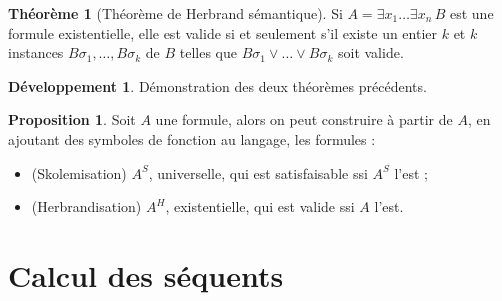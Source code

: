 \documentclass[a4paper, 11pt, twocolumn]{article}
\theoremstyle{definition}
\newtheorem{definition}[equation]{Définition}
\newtheorem{proposition}[equation]{Proposition}
\newtheorem{theorem}[equation]{Théorème}
\newcounter{n}
\newtheorem{dev}[n]{Développement}
\begin{document}
\begin{theorem}[Théorème de Herbrand sémantique]
  Si $A = \exists x_1 \ldots \exists x_n\, B$ est une formule existentielle,
  elle est valide si et seulement s'il existe un entier $k$ et $k$ instances $B
  \sigma_1, \ldots, B \sigma_k$ de $B$ telles que $B \sigma_1 \lor \ldots \lor B
  \sigma_k$ soit valide.
\end{theorem}

\begin{dev}
  Démonstration des deux théorèmes précédents.
\end{dev}

\begin{proposition}
  Soit $A$ une formule, alors on peut construire à partir de $A$, en ajoutant
  des symboles de fonction au langage, les formules :
  \begin{itemize}
  \item (Skolemisation) $A^S$, universelle, qui est satisfaisable ssi $A^S$
    l'est ;
  \item (Herbrandisation) $A^H$, existentielle, qui est valide ssi $A$ l'est.
  \end{itemize}
\end{proposition}




\section{Calcul des séquents}
\end{document}
